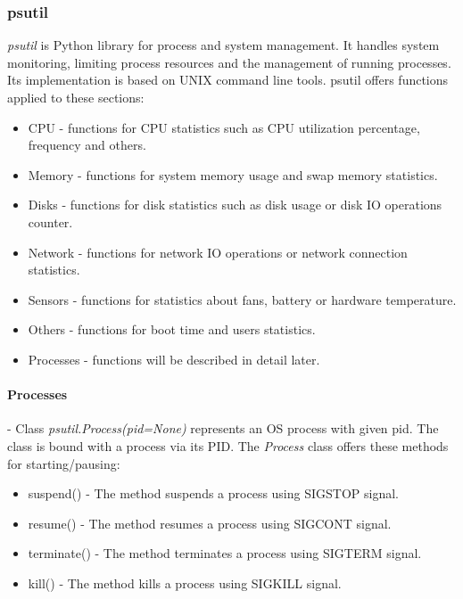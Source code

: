 \documentclass[12pt,a4paper]{article}
\begin{document}
\subsubsection{psutil}
\textit{psutil} is Python library for process and system management. It handles system monitoring, limiting process resources
and the management of running processes. Its implementation is based on UNIX command line tools. psutil offers functions applied
to these sections:
\begin{itemize}
\item CPU - functions for CPU statistics such as CPU utilization percentage, frequency and others. 
\item Memory - functions for system memory usage and swap memory statistics.
\item Disks - functions for disk statistics such as disk usage or disk IO operations counter.
\item Network - functions for network IO operations or network connection statistics.
\item Sensors - functions for statistics about fans, battery or hardware temperature.
\item Others - functions for boot time and users statistics.
\item Processes - functions will be described in detail later.
\end{itemize}

\paragraph{Processes} - Class \textit{psutil.Process(pid=None)} represents an OS process with given pid. The class is
bound with a process via its PID. The \textit{Process} class offers these methods for starting/pausing:
\begin{itemize}
\item suspend() - The method suspends a process using SIGSTOP signal.
\item resume() - The method resumes a process using SIGCONT signal.
\item terminate() - The method terminates a process using SIGTERM signal.
\item kill() - The method kills a process using SIGKILL signal.
\end{itemize}
\end{document}
